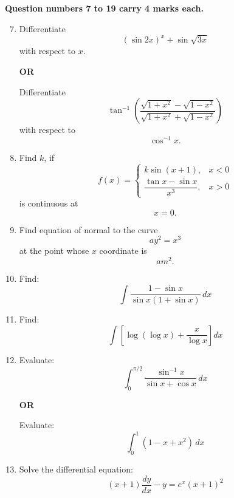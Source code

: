 \documentclass[12pt]{article}
\begin{document}
\textbf{Question numbers 7 to 19 carry 4 marks each.}

\begin{enumerate}
\setcounter{enumi}{6}

\item Differentiate
\[
(\sin 2x)^x+\sin\sqrt{3x}
\]
with respect to $x$.

\textbf{OR}

Differentiate
\[
\tan^{-1}\left(
\frac{\sqrt{1+x^2}-\sqrt{1-x^2}}
{\sqrt{1+x^2}+\sqrt{1-x^2}}
\right)
\]
with respect to
\[
\cos^{-1}x.
\]

\item Find $k$, if
\[
f(x)=
\begin{cases}
k\sin(x+1), & x<0\\
\dfrac{\tan x-\sin x}{x^3}, & x>0
\end{cases}
\]
is continuous at
\[
x=0.
\]

\item Find equation of normal to the curve
\[
ay^2=x^3
\]
at the point whose $x$ coordinate is
\[
am^2.
\]

\item Find:
\[
\int \frac{1-\sin x}{\sin x(1+\sin x)}\,dx
\]

\item Find:
\[
\int \left[\log(\log x)+\frac{x}{\log x}\right]dx
\]

\item Evaluate:
\[
\int_{0}^{\pi/2}
\frac{\sin^{-1}x}{\sin x+\cos x}\,dx
\]

\textbf{OR}

Evaluate:
\[
\int_{0}^{1}(1-x+x^2)\,dx
\]

\item Solve the differential equation:
\[
(x+1)\frac{dy}{dx}-y=e^x(x+1)^2
\]

\end{enumerate}
\end{document}
